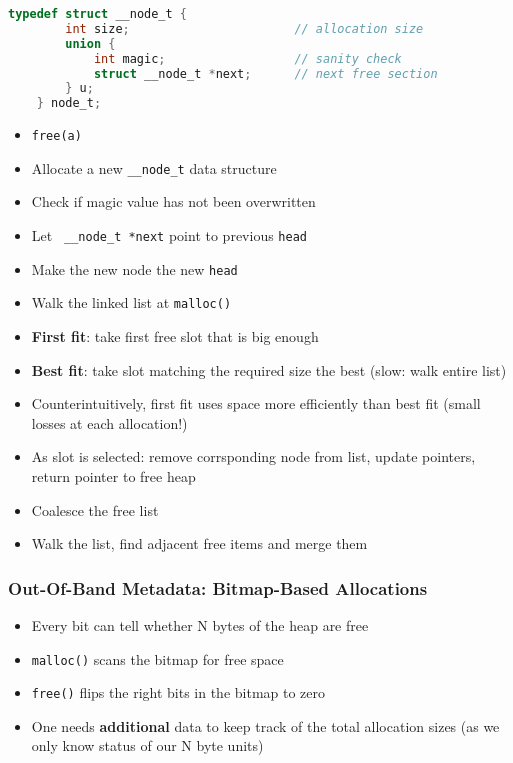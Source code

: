 \begin{lstlisting}[language={C}]
    typedef struct __node_t {
        int size;                       // allocation size
        union {
            int magic;                  // sanity check
            struct __node_t *next;      // next free section
        } u;
    } node_t;         
\end{lstlisting}


\begin{itemize}
    \item \lstinline{free(a)}
    \item Allocate a new \lstinline{__node_t} data structure
    \item Check if magic value has not been overwritten
    \item Let \lstinline{ __node_t *next} point to previous \lstinline{head}
    \item Make the new node the new \lstinline{head}
\end{itemize}


\begin{itemize}
    \item Walk the linked list at \lstinline{malloc()}
    \item \textbf{First fit}: take first free slot that is big enough
    \item \textbf{Best fit}: take slot matching the required size the best (slow: walk entire list)
    \item Counterintuitively, first fit uses space more efficiently than best fit (small losses at each allocation!)
    \item As slot is selected: remove corrsponding node from list, update pointers, return pointer to free heap
\end{itemize}


\begin{itemize}
    \item Coalesce the free list
    \item Walk the list, find adjacent free items and merge them
\end{itemize}

\subsubsection{Out-Of-Band Metadata: Bitmap-Based Allocations}
\begin{itemize}
    \item Every bit can tell whether N bytes of the heap are free
    \item \lstinline{malloc()} scans the bitmap for free space
    \item \lstinline{free()} flips the right bits in the bitmap to zero
    \item One needs \textbf{additional} data to keep track of the total allocation sizes (as we only know status of our N byte units)
\end{itemize}

